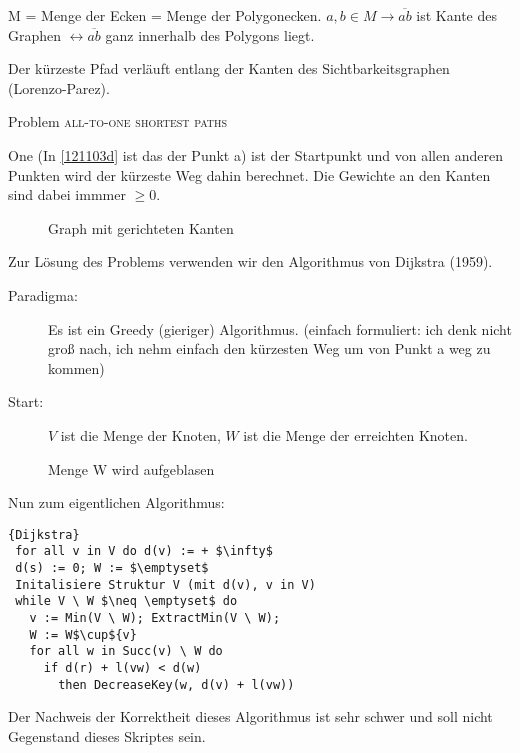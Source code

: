 \begin{definition}
M = Menge der Ecken = Menge der Polygonecken.
$a, b \in M \rightarrow \overline{ab}$ ist Kante des Graphen $\leftrightarrow \overline{ab}$ ganz innerhalb des Polygons liegt.
\end{definition}

\begin{satz}
Der kürzeste Pfad verläuft entlang der Kanten des Sichtbarkeitsgraphen (Lorenzo-Parez).
\end{satz}
Problem \textsc{all-to-one shortest paths}

One (In \autoref{121103d} ist das der Punkt a) ist der Startpunkt und von allen anderen
Punkten wird der kürzeste Weg dahin berechnet.
Die Gewichte an den Kanten sind dabei immmer $\geq 0$.

\begin{figure}[ht]
  \centering
  \caption{Graph mit gerichteten Kanten}
  \label{121103d}
\end{figure}

Zur Lösung des Problems verwenden wir den Algorithmus von Dijkstra (1959).

\begin{description}
\item[Paradigma: ] Es ist ein Greedy (gieriger) Algorithmus.
(einfach formuliert: ich denk nicht groß nach, ich nehm einfach den kürzesten Weg um von Punkt a weg zu kommen)
\item[Start: ] $V$ ist die Menge der Knoten, $W$ ist die Menge der erreichten Knoten.
\end{description}

\begin{figure}[H]
  \centering
  \caption{Menge W wird aufgeblasen}
  \label{121103e}
\end{figure}
Nun zum eigentlichen Algorithmus:

\begin{Algorithmus}[ht]
\begin{lstlisting}[frame=tlrb, mathescape=true, title=\textsc{Dijkstra}, gobble=1]{Dijkstra}
 for all v in V do d(v) := + $\infty$
 d(s) := 0; W := $\emptyset$
 Initalisiere Struktur V (mit d(v), v in V)
 while V \ W $\neq \emptyset$ do
   v := Min(V \ W); ExtractMin(V \ W);
   W := W$\cup${v}
   for all w in Succ(v) \ W do
     if d(r) + l(vw) < d(w)
       then DecreaseKey(w, d(v) + l(vw))
\end{lstlisting}

Der Nachweis der Korrektheit dieses Algorithmus ist sehr schwer und soll nicht Gegenstand
dieses Skriptes sein.
\end{Algorithmus}   %

